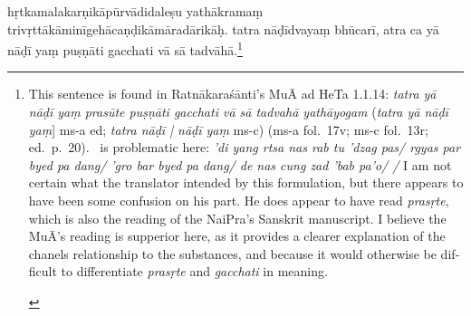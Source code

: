 \documentclass[naipra.tex]{subfiles}
\begin{document}
\begin{sanskrit}

\pstart
hṛtkamalakarṇikāpūrvādidaleṣu yathākramaṃ trivṛttā\dsh kāminī\dsh gehā\dsh caṇḍikā\dsh māradārikāḥ. 
tatra  nāḍīdvayaṃ bhūcarī, 
atra ca yā nāḍī yaṃ  puṣṇāti gacchati vā sā tadvāhā.\footnote{
	\begin{english}%
		This sentence is found in Ratnākaraśānti's MuĀ ad HeTa 1.1.14: \emph{tatra yā nāḍī yaṃ prasūte puṣṇāti gacchati vā sā tadvahā yathāyogam} (\emph{tatra yā nāḍī yaṃ}] ms-a ed; \emph{tatra nāḍī | nāḍī yaṃ} ms-c) (ms-a fol.\ 17v; ms-c fol.\ 13r; ed.\ p.\ 20).
		\TIB\ is problematic here: \emph{'di yang rtsa nas rab tu 'dzag pas/ rgyas par byed pa dang/ 'gro bar byed pa dang/ de nas cung zad 'bab pa'o/ /}
		I am not certain what the translator intended by this formulation, but there appears to have been some confusion on his part.
		He does appear to have read \emph{prasṛte}, which is also the reading of the NaiPra's Sanskrit manuscript.
		I believe the MuĀ's reading is supperior here, as it provides a clearer explanation of the chanels relationship to the substances, and because it would otherwise be difficult to differentiate \emph{prasṛte} and \emph{gacchati} in meaning.
	\end{english}
} 
\pend




\end{sanskrit}
\end{document}
